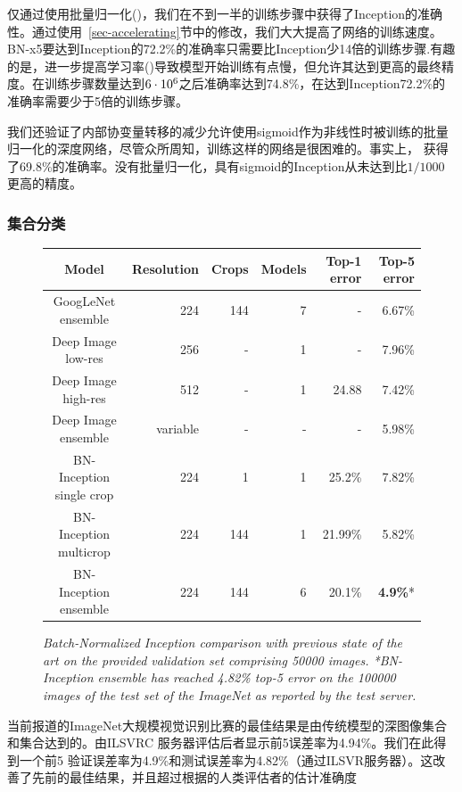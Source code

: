 \documentclass[twocolumn]{article}
\begin{document}
仅通过使用批量归一化()，我们在不到一半的训练步骤中获得了Inception的准确性。通过使用~\ref{sec-accelerating}节中的修改，我们大大提高了网络的训练速度。BN-x5要达到Inception的72.2\%的准确率只需要比Inception少14倍的训练步骤.有趣的是，进一步提高学习率()导致模型开始训练有点慢，但允许其达到更高的最终精度。在训练步骤数量达到$6\cdot 10^6$之后准确率达到74.8\%，在达到Inception72.2\%的准确率需要少于5倍的训练步骤。

我们还验证了内部协变量转移的减少允许使用sigmoid作为非线性时被训练的批量归一化的深度网络，尽管众所周知，训练这样的网络是很困难的。事实上， 获得了69.8\%的准确率。没有批量归一化，具有sigmoid的Inception从未达到比$1/1000$更高的精度。

\subsubsection{集合分类}

\begin{figure}[t!]
\centering
\begin{tabular}{c | r  r  r  r  r }
\hline
Model & Resolution & Crops & Models & Top-1 error & Top-5 error \\ 
\hline
{GoogLeNet ensemble} & 224 & 144 & 7 & - & 6.67\% \\
{Deep Image low-res} & 256 & - & 1 & - & 7.96\% \\
{Deep Image high-res} & 512 & - & 1 & 24.88 & 7.42\% \\
{Deep Image ensemble} & variable & - & - & - & 5.98\% \\
{BN-Inception single crop} & 224 & 1 & 1 & 25.2\% & 7.82\% \\
{BN-Inception multicrop} & 224 & 144 & 1 & 21.99\% & 5.82\% \\
{BN-Inception ensemble} & 224 & 144 & 6 & 20.1\% & {\bf 4.9\%}* \\
\hline
\end{tabular}
\caption{\em Batch-Normalized Inception comparison with previous state of the art on the provided validation set comprising 50000 images.
  *BN-Inception ensemble has reached 4.82\% top-5 error on the 100000 images of the test set of the ImageNet as reported by the test server. }
\label{fig-classification-comparison}
\end{figure}

当前报道的ImageNet大规模视觉识别比赛的最佳结果是由传统模型的深图像集合\cite{deepimage}和\cite{msr}集合达到的。由ILSVRC 服务器评估后者显示前5误差率为4.94\%。我们在此得到一个前5 验证误差率为4.9\%和测试误差率为4.82\%（通过ILSVR服务器）。这改善了先前的最佳结果，并且超过根据的人类评估者的估计准确度\cite{imagenet}
\end{document}
